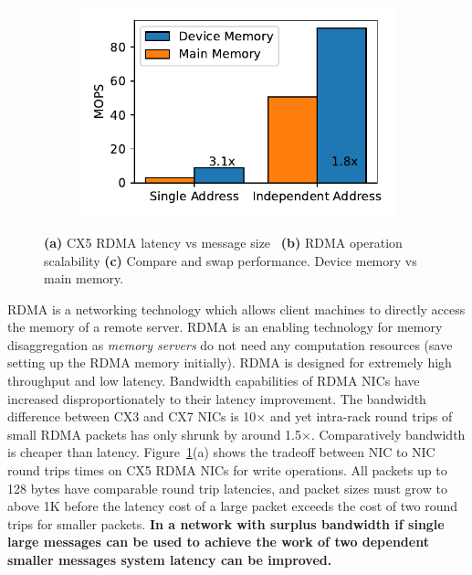 \begin{figure}[t]
\begin{subfigure}{0.3\linewidth}
        \includegraphics[width=0.99\linewidth]{fig/rdma_cas_throughput.pdf}
    \end{subfigure}
    \vspace{-1em}
    \caption{
    \textbf{(a)} CX5 RDMA latency vs message size~\cite{rdma-latency}
    \textbf{(b)} RDMA operation scalability
    \textbf{(c)} Compare and swap performance. Device memory vs main memory.
    }
    \label{fig:rdma-benchmarks}
\end{figure}

RDMA is a networking technology which allows client machines
to directly access the memory of a remote server. RDMA is an
enabling technology for memory disaggregation as
\textit{memory servers} do not need any computation
resources (save setting up the RDMA memory initially). RDMA
is designed for extremely high throughput and low latency.
Bandwidth capabilities of RDMA NICs have increased
disproportionately to their latency improvement. The
bandwidth difference between CX3 and CX7 NICs is 10$\times$ and yet
intra-rack round trips of small RDMA packets has only shrunk
by around 1.5$\times$. Comparatively bandwidth is cheaper than
latency. Figure~\ref{fig:rdma-benchmarks}(a) shows the tradeoff
between NIC to NIC round trips times on CX5 RDMA NICs for
write operations. All packets up to 128 bytes have
comparable round trip latencies, and packet sizes must grow
to above 1K before the latency cost of a large packet exceeds the
cost of two round trips for smaller packets. \textbf{In a network
with surplus bandwidth if single large messages can be used
to achieve the work of two dependent smaller messages system
latency can be improved.}


